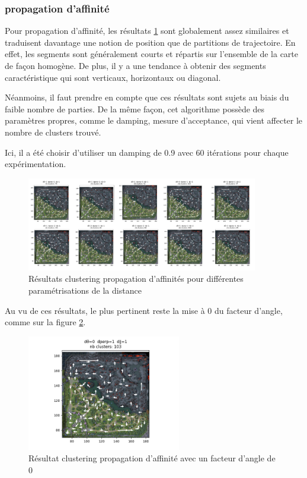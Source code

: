 \subsubsection{propagation d'affinité}

Pour propagation d'affinité, les résultats \ref{fig:propa_seq} sont globalement assez similaires et traduisent davantage une notion de position que de partitions de trajectoire. En effet, les segments sont généralement courts et répartis sur l'ensemble de la carte de façon homogène. De plus, il y a une tendance à obtenir des segments caractéristique qui sont verticaux, horizontaux ou diagonal.

Néanmoins, il faut prendre en compte que ces résultats sont sujets au biais du faible nombre de parties. De la même façon, cet algorithme possède des paramètres propres, comme le damping, mesure d'acceptance, qui vient affecter le nombre de clusters trouvé.

Ici, il a été choisir d'utiliser un damping de 0.9 avec 60 itérations pour chaque expérimentation.

\begin{figure}[h!]
    \centering
    \includegraphics[width=0.9\textwidth]{Images/propa/propa_variations.png}
    \caption{Résultats clustering propagation d'affinités pour différentes paramétrisations de la distance}
    \label{fig:propa_seq}
\end{figure}

Au vu de ces résultats, le plus pertinent reste la mise à 0 du facteur d'angle, comme sur la figure \ref{fig:propa_011}.

\begin{figure}[h!]
    \centering
    \includegraphics[width=0.6\textwidth]{Images/propa/propa4_0_1_1.png}
    \caption{Résultat clustering propagation d'affinité avec un facteur d'angle de 0}
    \label{fig:propa_011}
\end{figure}



